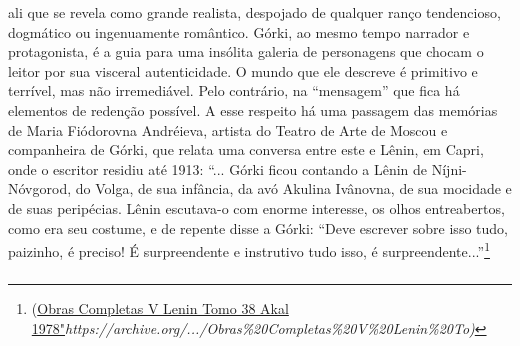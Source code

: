 ali que se revela como grande realista, despojado de qualquer ranço
tendencioso, dogmático ou ingenuamente romântico. Górki, ao mesmo tempo
narrador e protagonista, é a guia para uma insólita galeria de
personagens que chocam o leitor por sua visceral autenticidade. O mundo
que ele descreve é primitivo e terrível, mas não irremediável. Pelo
contrário, na ``mensagem'' que fica há elementos de redenção possível. A
esse respeito há uma passagem das memórias de Maria Fiódorovna
Andréieva, artista do Teatro de Arte de Moscou e companheira de Górki,
que relata uma conversa entre este e Lênin, em Capri, onde o escritor
residiu até 1913: ``... Górki ficou contando a Lênin de Níjni-Nóvgorod,
do Volga, de sua infância, da avó Akulina Ivânovna, de sua mocidade e de
suas peripécias. Lênin escutava-o com enorme interesse, os olhos
entreabertos, como era seu costume, e de repente disse a Górki: ``Deve
escrever sobre isso tudo, paizinho, é preciso! É surpreendente e
instrutivo tudo isso, é surpreendente...''\footnote{(\href{https://www.google.com.br/url?sa=t\&rct=j\&q=\&esrc=s\&source=web\&cd=4\&ved=0ahUKEwjq34mR84_bAhXIlJAKHcoWDvoQFgg3MAM\&url=https\%3A\%2F\%2Farchive.org\%2Fstream\%2FObrasCompletasVLeninTomo38Akal1978\%2FObras\%2520Completas\%2520V\%2520Lenin\%2520Tomo\%252038\%2520Akal\%25201978_djvu.txt\&usg=AOvVaw3Au-jGYqgIHGqnhK_fzK5i}{Obras
  Completas V Lenin Tomo 38 Akal
  1978"}\emph{https://archive.org/.../Obras\%20Completas\%20V\%20Lenin\%20To)}}

\subsubsection{}\label{section-1}

